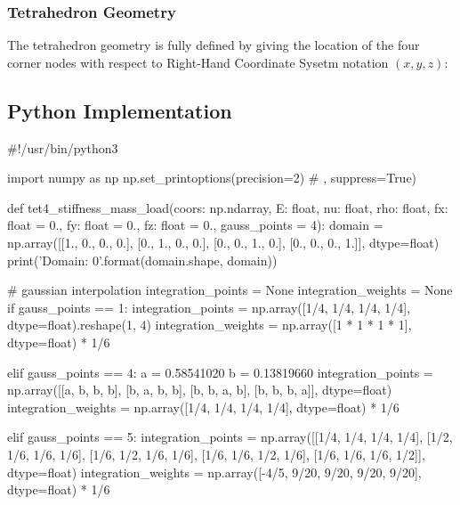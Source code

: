 \documentclass[10pt,b5paper,titlepage]{book}
\begin{document}
\subsubsection{Tetrahedron Geometry}

The tetrahedron geometry is fully defined by giving the location of the four
corner nodes with respect to Right-Hand Coordinate Sysetm notation $ (x, y, z) $:




\subsection{Python Implementation}
\begin{python}
#!/usr/bin/python3

import numpy as np
np.set_printoptions(precision=2) # , suppress=True)

def tet4_stiffness_mass_load(coors: np.ndarray,
                             E: float,
                             nu: float,
                             rho: float,
                             fx: float = 0.,
                             fy: float = 0.,
                             fz: float = 0.,
                             gauss_points = 4):
    domain = np.array([[1., 0., 0., 0.],
                       [0., 1., 0., 0.],
                       [0., 0., 1., 0.],
                       [0., 0., 0., 1.]], dtype=float)
    print('Domain: {0}'.format(domain.shape, domain))

    # gaussian interpolation
    integration_points = None
    integration_weights = None
    if gauss_points == 1:
        integration_points = np.array([1/4, 1/4, 1/4, 1/4],
                                      dtype=float).reshape(1, 4)
        integration_weights = np.array([1 * 1 * 1 * 1],
                                       dtype=float) * 1/6

    elif gauss_points == 4:
        a = 0.58541020
        b = 0.13819660
        integration_points = np.array([[a, b, b, b],
                                       [b, a, b, b],
                                       [b, b, a, b],
                                       [b, b, b, a]], dtype=float)
        integration_weights = np.array([1/4, 1/4, 1/4, 1/4],
                                       dtype=float) * 1/6

    elif gauss_points == 5:
        integration_points = np.array([[1/4, 1/4, 1/4, 1/4],
                                       [1/2, 1/6, 1/6, 1/6],
                                       [1/6, 1/2, 1/6, 1/6],
                                       [1/6, 1/6, 1/2, 1/6],
                                       [1/6, 1/6, 1/6, 1/2]], dtype=float)
        integration_weights = np.array([-4/5, 9/20, 9/20, 9/20, 9/20],
                                       dtype=float) * 1/6


\end{python}
\end{document}
